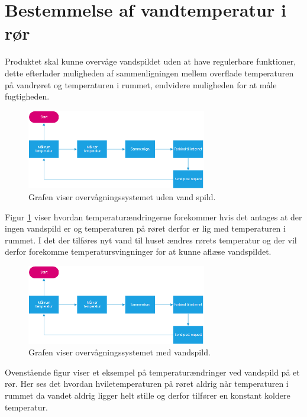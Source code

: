 \section{Bestemmelse af vandtemperatur i rør}
Produktet skal kunne overvåge vandspildet uden at have regulerbare funktioner, dette efterlader muligheden af sammenligningen mellem overflade temperaturen på vandrøret og temperaturen i rummet, endvidere muligheden for at måle fugtigheden.  

\begin{figure}[h!]
  \centering
  \includegraphics[width=0.7\textwidth]{figures/Fase2software.png}
  \caption{Grafen viser overvågningssystemet uden vand spild.}
  \label{tempgraf_eksempel1}
\end{figure}



Figur \ref{tempgraf_eksempel1} viser hvordan temperaturændringerne forekommer hvis det antages at der ingen vandspild er og temperaturen på røret derfor er lig med temperaturen i rummet. I det der tilføres nyt vand til huset ændres rørets temperatur og der vil derfor forekomme temperatursvingninger for at kunne aflæse vandspildet.





\begin{figure}[h!]
  \centering
  \includegraphics[width=0.7\textwidth]{figures/Fase2software.png}
  \caption{Grafen viser overvågningssystemet med vandspild.}
  \label{tempgraf_eksempelspild}
\end{figure}


Ovenstående figur viser et eksempel på temperaturændringer ved vandspild på et rør. Her ses det hvordan hviletemperaturen på røret aldrig når temperaturen i rummet da vandet aldrig ligger helt stille og derfor tilfører en konstant koldere temperatur.  



    